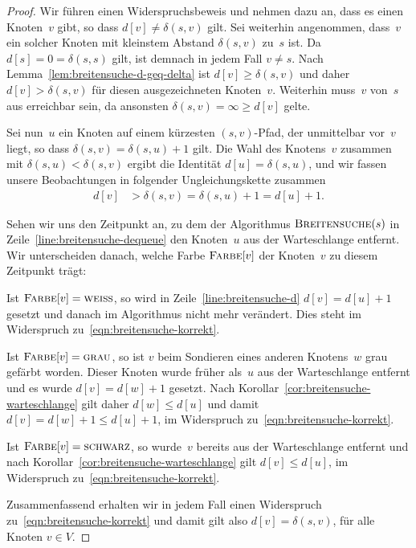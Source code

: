 \begin{proof}
Wir führen einen Widerspruchsbeweis und nehmen dazu an, dass es einen Knoten~$v$ gibt, so dass $d[v] \neq \delta(s,v)$ gilt.
Sei weiterhin angenommen, dass~$v$ ein solcher Knoten mit kleinstem Abstand $\delta(s,v)$ zu~$s$ ist.
Da $d[s]=0=\delta(s,s)$ gilt, ist demnach in jedem Fall $v \neq s$.
Nach Lemma~\ref{lem:breitensuche-d-geq-delta} ist $d[v] \geq \delta(s,v)$ und daher $d[v] > \delta(s,v)$ für diesen ausgezeichneten Knoten~$v$.
Weiterhin muss~$v$ von~$s$ aus erreichbar sein, da ansonsten $\delta(s,v)=\infty \geq d[v]$ gelte.

\condclearpage

Sei nun~$u$ ein Knoten auf einem kürzesten $(s,v)$-Pfad, der unmittelbar vor~$v$ liegt, so dass $\delta(s,v)=\delta(s,u)+1$ gilt.
Die Wahl des Knotens~$v$ zusammen mit $\delta(s,u) < \delta(s,v)$ ergibt die Identität $d[u]=\delta(s,u)$, und wir fassen unsere Beobachtungen in folgender Ungleichungskette zusammen
\begin{align}
d[v] &> \delta(s,v) = \delta(s,u) + 1 = d[u] + 1.\label{eqn:breitensuche-korrekt}
\end{align}

\condclearpage

Sehen wir uns den Zeitpunkt an, zu dem der Algorithmus $\mathop{\text{\textsc{Breitensuche}}}(s)$ in Zeile~\ref{line:breitensuche-dequeue} den Knoten~$u$ aus der Warteschlange entfernt.
Wir unterscheiden danach, welche Farbe $\mathop{\text{\textsc{Farbe}}}[v]$ der Knoten~$v$ zu diesem Zeitpunkt trägt:

Ist $\mathop{\text{\textsc{Farbe}}}[v]=\mathop{\text{\textsc{weiss}}}$, so wird in Zeile~\ref{line:breitensuche-d} $d[v]=d[u]+1$ gesetzt und danach im Algorithmus nicht mehr verändert.
Dies steht im Widerspruch zu~\eqref{eqn:breitensuche-korrekt}.

Ist $\mathop{\text{\textsc{Farbe}}}[v]=\mathop{\text{\textsc{grau}}}$, so ist $v$ beim Sondieren eines anderen Knotens~$w$  grau gefärbt worden.
Dieser Knoten wurde früher als~$u$ aus der Warteschlange entfernt und es wurde $d[v]=d[w]+1$ gesetzt.
Nach Korollar~\ref{cor:breitensuche-warteschlange} gilt daher $d[w] \leq d[u]$ und damit $d[v]=d[w]+1 \leq d[u]+1$, im Widerspruch zu~\eqref{eqn:breitensuche-korrekt}.

Ist $\mathop{\text{\textsc{Farbe}}}[v]=\mathop{\text{\textsc{schwarz}}}$, so wurde~$v$ bereits aus der Warteschlange entfernt und nach Korollar~\ref{cor:breitensuche-warteschlange} gilt $d[v] \leq d[u]$, im Widerspruch zu~\eqref{eqn:breitensuche-korrekt}.

Zusammenfassend erhalten wir in jedem Fall einen Widerspruch zu~\eqref{eqn:breitensuche-korrekt} und damit gilt also $d[v]=\delta(s,v)$, für alle Knoten $v \in V$.


\end{proof}
